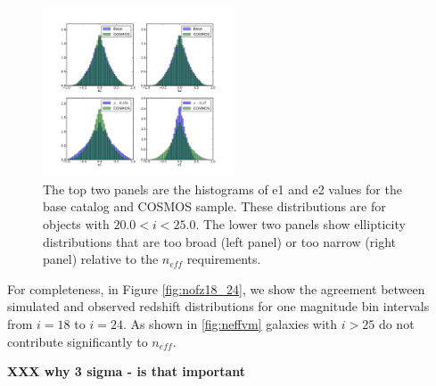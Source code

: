\documentclass[11pt]{article}
\begin{document}
\begin{figure}[h]
\centering
\includegraphics[width=0.5\textwidth]{validation_figures/e_hist.png}
\caption{The top two panels are the histograms of e1 and e2 values for
  the base catalog and COSMOS sample.  These distributions are for
  objects with $20.0 < i < 25.0$. The lower two panels show
  ellipticity distributions that are too broad (left panel) or too
  narrow (right panel) relative to the $n_{eff}$ requirements.}
\label{e_hist}
\end{figure}

For completeness, in Figure \ref{fig:nofz18_24}, we show the agreement
between simulated and observed \citep{coil04} redshift distributions
for one magnitude bin intervals from $i=18$ to $i=24$.  As shown in
\ref{fig:neffvm} galaxies with $i > 25$ do not contribute significantly to $n_{eff}$.

{\bf XXX why 3 sigma - is that important}
\end{document}
